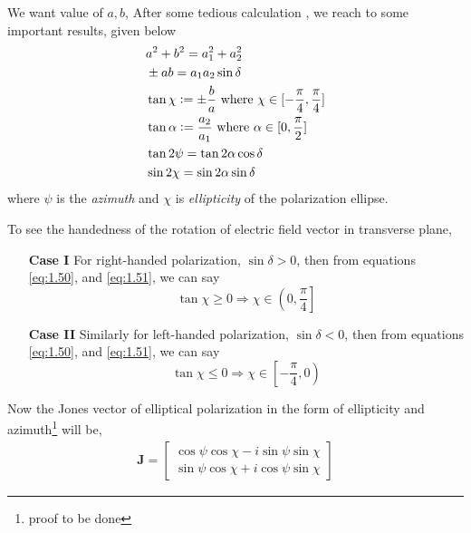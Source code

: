 \documentclass[11pt,a4paper]{article}
\numberwithin{equation}{section}
\begin{document}
We want value of $a, b$, After some tedious calculation \cite{born-wolf}, we reach to some important results, given below 
\begin{align}
	& a^2 + b^2 = a_1^2 + a_2^2\\
	&\pm ab = a_1a_2\sin\delta \label{eq:1.50}\\ 
	&\tan \chi \vcentcolon= \pm\frac{b}{a} \label{eq:1.51}\text{ where } \chi\in[-\frac{\pi}{4},\frac{\pi}{4}]\\
	&\tan \alpha \vcentcolon= \frac{a_2}{a_1} \text{ where } \alpha\in[0,\frac{\pi}{2}]\\
	&\tan 2\psi = \tan 2\alpha \cos\delta\\
	&\sin 2\chi = \sin 2\alpha \sin\delta
\end{align}
where $\psi$ is the \textit{azimuth} and $\chi$ is \textit{ellipticity} of the polarization ellipse. 

To see the handedness of the rotation of electric field vector in transverse plane,
\begin{enumerate}
	\item[\textbf{Case I}] 
	For right-handed polarization, $\sin\delta>0$, then from equations \ref{eq:1.50}, and \ref{eq:1.51}, we can say 
	$$\tan \chi \ge 0\Rightarrow \chi \in \left(0,\frac{\pi}{4}\right]$$
	
	\item[\textbf{Case II}] 
	Similarly for left-handed polarization, $\sin\delta<0$, then from equations \ref{eq:1.50}, and \ref{eq:1.51}, we can say 
	$$\tan \chi \le 0\Rightarrow \chi \in \left[-\frac{\pi}{4},0\right)$$
\end{enumerate}
	
Now the Jones vector of elliptical polarization in the form of ellipticity and azimuth\footnote{proof to be done} will be,
\begin{align}
	\boldsymbol{J}= 
		\begin{bmatrix}
			\cos\psi\cos\chi- i \sin\psi\sin\chi \\
			\sin\psi\cos\chi+ i \cos\psi\sin\chi
		\end{bmatrix}
\end{align}
\end{document}
